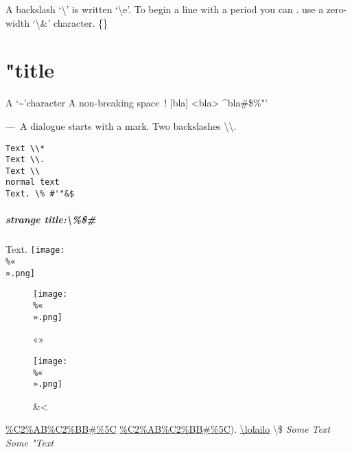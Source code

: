 A backslash `\textbackslash{}' is written `\textbackslash{}e'. To begin a line with a period you can
. use a zero-width `\textbackslash{}\&' character. \{\}

\chapter{"title}
\label{s:1}
A `\~{}'character
A non-breaking space~!
[bla]
<bla>
\^{}bla\#\$\%"'

—~A dialogue starts with a mark.
Two backslashes \textbackslash{}\textbackslash{}.

\begin{verbatim}
Text \\*
Text \\.
Text \\
normal text
Text. \% #'"&$
\end{verbatim}

\paragraph{strange title:\textbackslash{}\%\$\#}
Text.
\texttt{[image: \\\%«\\».png]}

\begin{center}
\begin{figure}[htbp]
\texttt{[image: \\\%«\\».png]}
\caption{«»}
\label{fig:1}
\end{figure}
\end{center}
\begin{center}
\begin{figure}[htbp]
\texttt{[image: \\\%«\\».png]}
\caption{\&<}
\label{fig:2}
\end{figure}
\end{center}

\url{\%C2\%AB\%C2\%BB#\%5C}
\url{\%C2\%AB\%C2\%BB#\%5C}).
\hyperref[s:1]{\textbackslash{}lolailo}
\textbackslash{}\$
\emph{Some     Text}
\emph{Some     "Text}

